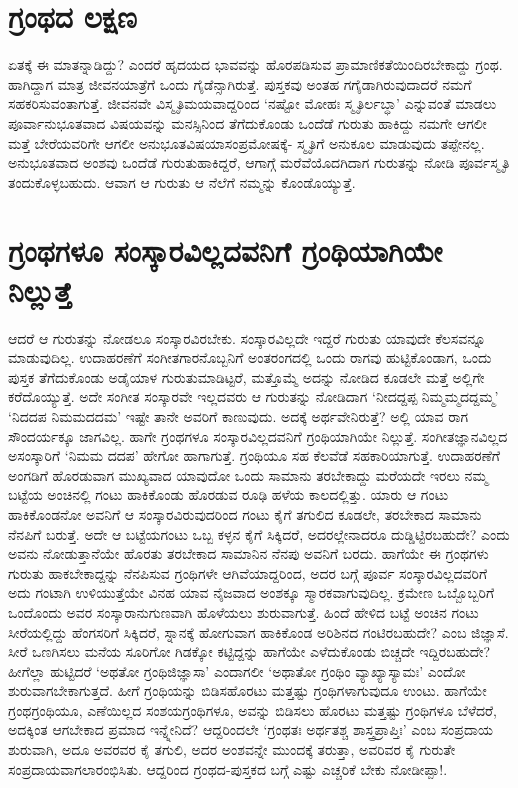 \section*{ಗ್ರಂಥದ ಲಕ್ಷಣ}

ಏತಕ್ಕೆ ಈ ಮಾತನ್ನಾಡಿದ್ದು? ಎಂದರೆ ಹೃದಯದ ಭಾವವನ್ನು ಹೊರಪಡಿಸುವ ಪ್ರಾಮಾಣಿಕತೆಯಿಂದಿರಬೇಕಾದ್ದು ಗ್ರಂಥ. ಹಾಗಿದ್ದಾಗ ಮಾತ್ರ ಜೀವನಯಾತ್ರೆಗೆ ಒಂದು ಗೈಡೆನ್ಸಾಗಿರುತ್ತೆ. ಪುಸ್ತಕವು ಅಂತಹ ಗಗೈಡಾಗಿರುವುದಾದರೆ ನಮಗೆ ಸಹಕರಿಸುವಂತಾಗುತ್ತೆ. ಜೀವನವೇ ವಿಸ್ಮೃತಿಮಯವಾದ್ದರಿಂದ `ನಷ್ಟೋ ಮೋಹಃ ಸ್ಮೃತಿರ್ಲಬ್ಧಾ' ಎನ್ನುವಂತೆ ಮಾಡಲು ಪೂರ್ವಾನುಭೂತವಾದ ವಿಷಯವನ್ನು ಮನಸ್ಸಿನಿಂದ ತೆಗೆದುಕೊಂಡು ಒಂದೆಡೆ ಗುರುತು ಹಾಕಿದ್ದು ನಮಗೇ ಆಗಲೀ ಮತ್ತೆ ಬೇರೆಯವರಿಗೇ ಆಗಲೀ ಅನುಭೂತವಿಷಯಾಸಂಪ್ರಮೋಷಕ್ಕೆ- ಸ್ಮೃತಿಗೆ ಅನುಕೂಲ ಮಾಡುವುದು ತಪ್ಪೇನಲ್ಲ. ಅನುಭೂತವಾದ ಅಂಶವು ಒಂದೆಡೆ ಗುರುತುಹಾಕಿದ್ದರೆ, ಆಗಾಗ್ಗೆ ಮರೆವೆಯೊದಗಿದಾಗ ಗುರುತನ್ನು ನೋಡಿ ಪೂರ್ವಸ್ಮೃತಿ ತಂದುಕೊಳ್ಳಬಹುದು. ಆವಾಗ ಆ ಗುರುತು ಆ ನೆಲೆಗೆ ನಮ್ಮನ್ನು ಕೊಂಡೊಯ್ಯುತ್ತೆ. 

\section*{ಗ್ರಂಥಗಳೂ ಸಂಸ್ಕಾರವಿಲ್ಲದವನಿಗೆ ಗ್ರಂಥಿಯಾಗಿಯೇ ನಿಲ್ಲುತ್ತೆ}

ಆದರೆ ಆ ಗುರುತನ್ನು ನೋಡಲೂ ಸಂಸ್ಕಾರವಿರಬೇಕು. ಸಂಸ್ಕಾರವಿಲ್ಲದೇ ಇದ್ದರೆ ಗುರುತು ಯಾವುದೇ ಕೆಲಸವನ್ನೂ ಮಾಡುವುದಿಲ್ಲ. ಉದಾಹರಣೆಗೆ ಸಂಗೀತಗಾರನೊಬ್ಬನಿಗೆ ಅಂತರಂಗದಲ್ಲಿ ಒಂದು ರಾಗವು ಹುಟ್ಟಿಕೊಂಡಾಗ, ಒಂದು ಪುಸ್ತಕ ತೆಗೆದುಕೊಂಡು ಅಡೈಯಾಳ ಗುರುತುಮಾಡಿಟ್ಟರೆ, ಮತ್ತೊಮ್ಮೆ ಅದನ್ನು ನೋಡಿದ ಕೂಡಲೇ ಮತ್ತೆ ಅಲ್ಲಿಗೇ ಕರೆದೊಯ್ಯುತ್ತೆ. ಅದೇ ಸಂಗೀತ ಸಂಸ್ಕಾರವೇ ಇಲ್ಲದವರು ಆ ಗುರುತನ್ನು ನೋಡಿದಾಗ `ನೀದದ್ದಪ್ಪ ನಿಮ್ಮಮ್ಮದದ್ದಮ್ಮ' `ನಿದದಪ ನಿಮಮದದಮ' ಇಷ್ಟೇ ತಾನೇ ಅವರಿಗೆ ಕಾಣುವುದು. ಅದಕ್ಕೆ ಅರ್ಥವೇನಿರುತ್ತೆ? ಅಲ್ಲಿ ಯಾವ ರಾಗ ಸೌಂದರ್ಯಕ್ಕೂ ಜಾಗವಿಲ್ಲ. ಹಾಗೇ ಗ್ರಂಥಗಳೂ ಸಂಸ್ಕಾರವಿಲ್ಲದವನಿಗೆ ಗ್ರಂಥಿಯಾಗಿಯೇ ನಿಲ್ಲುತ್ತೆ.  ಸಂಗೀತಜ್ಞಾನವಿಲ್ಲದ ಅಸಂಸ್ಕಾರಿಗೆ `ನಿಮಮ ದದಪ' ಹೇಗೋ ಹಾಗಾಗುತ್ತೆ. ಗ್ರಂಥಿಯೂ ಸಹ ಕೆಲವೆಡೆ ಸಹಕಾರಿಯಾಗುತ್ತೆ. ಉದಾಹರಣೆಗೆ ಅಂಗಡಿಗೆ ಹೊರಡುವಾಗ ಮುಖ್ಯವಾದ ಯಾವುದೋ ಒಂದು ಸಾಮಾನು ತರಬೇಕಾದ್ದು ಮರೆಯದೇ ಇರಲು ನಮ್ಮ ಬಟ್ಟೆಯ ಅಂಚಿನಲ್ಲಿ ಗಂಟು ಹಾಕಿಕೊಂಡು ಹೊರಡುವ ರೂಢಿ ಹಳೆಯ ಕಾಲದಲ್ಲಿತ್ತು. ಯಾರು ಆ ಗಂಟು ಹಾಕಿಕೊಂಡನೋ ಅವನಿಗೆ ಆ ಸಂಸ್ಕಾರವಿರುವುದರಿಂದ ಗಂಟು ಕೈಗೆ ತಗುಲಿದ ಕೂಡಲೇ, ತರಬೇಕಾದ ಸಾಮಾನು ನೆನಪಿಗೆ ಬರುತ್ತೆ. ಅದೇ ಆ ಬಟ್ಟೆಯಗಂಟು ಒಬ್ಬ ಕಳ್ಳನ ಕೈಗೆ ಸಿಕ್ಕಿದರೆ, ಅದರಲ್ಲೇನಾದರೂ ದುಡ್ಡಿಟ್ಟಿರಬಹುದೇ? ಎಂದು ಅವನು ನೋಡುತ್ತಾನೆಯೇ ಹೊರತು ತರಬೇಕಾದ ಸಾಮಾನಿನ ನೆನಪು ಅವನಿಗೆ ಬರದು. ಹಾಗೆಯೇ ಈ ಗ್ರಂಥಗಳು ಗುರುತು ಹಾಕಬೇಕಾದ್ದನ್ನು  ನೆನಪಿಸುವ ಗ್ರಂಥಿಗಳೇ ಆಗಿವೆಯಾದ್ದರಿಂದ, ಅದರ ಬಗ್ಗೆ ಪೂರ್ವ ಸಂಸ್ಕಾರವಿಲ್ಲದವರಿಗೆ ಅದು ಗಂಟಾಗಿ ಉಳಿಯುತ್ತೆಯೇ ವಿನಹ ಯಾವ ನೈಜವಾದ ಅಂಶಕ್ಕೂ ಸ್ಮಾರಕವಾಗುವುದಿಲ್ಲ. ಕ್ರಮೇಣ ಒಬ್ಬೊಬ್ಬರಿಗೆ ಒಂದೊಂದು ಅವರ ಸಂಸ್ಕಾರಾನುಗುಣವಾಗಿ ಹೊಳೆಯಲು ಶುರುವಾಗುತ್ತೆ. ಹಿಂದೆ ಹೇಳಿದ ಬಟ್ಟೆ ಅಂಚಿನ ಗಂಟು ಸೀರೆಯಲ್ಲಿದ್ದು ಹೆಂಗಸರಿಗೆ ಸಿಕ್ಕಿದರೆ, ಸ್ನಾನಕ್ಕೆ ಹೋಗುವಾಗ ಹಾಕಿಕೊಂಡ ಅರಿಶಿನದ ಗಂಟಿರಬಹುದೇ? ಎಂಬ ಜಿಜ್ಞಾಸೆ. ಸೀರೆ ಒಣಗಿಸಲು ಮನೆಯ ಸೂರಿಗೋ ಗಿಡಕ್ಕೋ ಕಟ್ಟಿದ್ದನ್ನು ಹಾಗೆಯೇ ಎಳೆದುಕೊಂಡು ಬಿಚ್ಚದೇ ಇದ್ದಿರಬಹುದೇ? ಹೀಗೆಲ್ಲಾ ಹುಟ್ಟಿದರೆ `ಅಥತೋ ಗ್ರಂಥಿಜಿಜ್ಞಾಸಾ' ಎಂದಾಗಲೀ `ಅಥಾತೋ ಗ್ರಂಥಿಂ ವ್ಯಾಖ್ಯಾಸ್ಯಾಮಃ' ಎಂದೋ ಶುರುವಾಗಬೇಕಾಗುತ್ತದೆ. ಹೀಗೆ ಗ್ರಂಥಿಯನ್ನು ಬಿಡಿಸಹೊರಟು ಮತ್ತಷ್ಟು ಗ್ರಂಥಿಗಳಾಗುವುದೂ ಉಂಟು. ಹಾಗೆಯೇ ಗ್ರಂಥಗ್ರಂಥಿಯೂ, ಎಣೆಯಿಲ್ಲದ ಸಂಶಯಗ್ರಂಥಿಗಳೂ, ಅವನ್ನು ಬಿಡಿಸಲು ಹೊರಟು ಮತ್ತಷ್ಟು  ಗ್ರಂಥಿಗಳೂ ಬೆಳೆದರೆ, ಅದಕ್ಕಿಂತ ಆಗಬೇಕಾದ ಪ್ರಮಾದ ಇನ್ನ್ನೇನಿದೆ? ಆದ್ದರಿಂದಲೇ `ಗ್ರಂಥತಃ ಅರ್ಥತಶ್ಚ ಶಾಸ್ತ್ರಪ್ರಾಪ್ತಿಃ' ಎಂಬ ಸಂಪ್ರದಾಯ ಶುರುವಾಗಿ, ಅದೂ ಅವರವರ ಕೈ ತಗುಲಿ, ಅದರ ಅಂಶವನ್ನೇ ಮುಂದಕ್ಕೆ ತರುತ್ತಾ, ಅವರಿವರ ಕೈ ಗುರುತೇ ಸಂಪ್ರದಾಯವಾಗಲಾರಂಭಿಸಿತು. ಆದ್ದರಿಂದ ಗ್ರಂಥದ-ಪುಸ್ತಕದ ಬಗ್ಗೆ ಎಷ್ಟು ಎಚ್ಚರಿಕೆ ಬೇಕು ನೋಡೀಪ್ಪಾ!.


